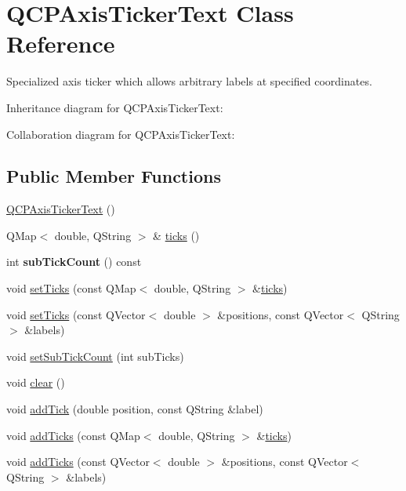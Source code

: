 \hypertarget{classQCPAxisTickerText}{}\section{Q\+C\+P\+Axis\+Ticker\+Text Class Reference}
\label{classQCPAxisTickerText}


Specialized axis ticker which allows arbitrary labels at specified coordinates.  




Inheritance diagram for Q\+C\+P\+Axis\+Ticker\+Text\+:


Collaboration diagram for Q\+C\+P\+Axis\+Ticker\+Text\+:
\subsection*{Public Member Functions}
\begin{DoxyCompactItemize}
\item 
\hyperlink{classQCPAxisTickerText_a1d7243b1256c1aa9d1d5b99b2e84e648}{Q\+C\+P\+Axis\+Ticker\+Text} ()
\item 
Q\+Map$<$ double, Q\+String $>$ \& \hyperlink{classQCPAxisTickerText_ac84622a6bb4f2a98474e185ecaf3189a}{ticks} ()
\item 
\mbox{\label{classQCPAxisTickerText_a5c3c59e8fdf4c96568dd50d4a653e791}} 
int {\bfseries sub\+Tick\+Count} () const
\item 
void \hyperlink{classQCPAxisTickerText_a8cdf1f21940f1f53f5e3d30b2c74f5cf}{set\+Ticks} (const Q\+Map$<$ double, Q\+String $>$ \&\hyperlink{classQCPAxisTickerText_ac84622a6bb4f2a98474e185ecaf3189a}{ticks})
\item 
void \hyperlink{classQCPAxisTickerText_a686f38f358a0cf2d9309c84c22581d9b}{set\+Ticks} (const Q\+Vector$<$ double $>$ \&positions, const Q\+Vector$<$ Q\+String $>$ \&labels)
\item 
void \hyperlink{classQCPAxisTickerText_a8cfa50c51183c90186892eeef978d571}{set\+Sub\+Tick\+Count} (int sub\+Ticks)
\item 
void \hyperlink{classQCPAxisTickerText_a21826d2fcd9a25c194d34d4f67aa1460}{clear} ()
\item 
void \hyperlink{classQCPAxisTickerText_a3362873a48614e6d446c193548cb85e3}{add\+Tick} (double position, const Q\+String \&label)
\item 
void \hyperlink{classQCPAxisTickerText_aba34051300eecaefbedb2df8feff2d45}{add\+Ticks} (const Q\+Map$<$ double, Q\+String $>$ \&\hyperlink{classQCPAxisTickerText_ac84622a6bb4f2a98474e185ecaf3189a}{ticks})
\item 
void \hyperlink{classQCPAxisTickerText_a8140c730e20b0050e1b702af3db00b2e}{add\+Ticks} (const Q\+Vector$<$ double $>$ \&positions, const Q\+Vector$<$ Q\+String $>$ \&labels)
\end{DoxyCompactItemize}

